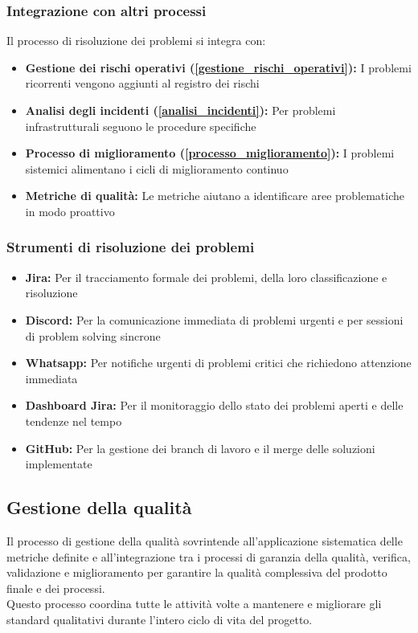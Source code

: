 \documentclass[a4paper,12pt]{article}
\begin{document}
\subsubsection{Integrazione con altri processi}\label{integrazione_risoluzione_problemi}
Il processo di risoluzione dei problemi si integra con:
\begin{itemize}
    \item \textbf{Gestione dei rischi operativi (\ref{gestione_rischi_operativi}):} I problemi ricorrenti vengono aggiunti al registro dei rischi
    \item \textbf{Analisi degli incidenti (\ref{analisi_incidenti}):} Per problemi infrastrutturali seguono le procedure specifiche
    \item \textbf{Processo di miglioramento (\ref{processo_miglioramento}):} I problemi sistemici alimentano i cicli di miglioramento continuo
    \item \textbf{Metriche di qualità:} Le metriche aiutano a identificare aree problematiche in modo proattivo
\end{itemize}

\subsubsection{Strumenti di risoluzione dei problemi}\label{strumenti_risoluzione_problemi}
\begin{itemize}
    \item \textbf{Jira:} Per il tracciamento formale dei problemi, della loro classificazione e risoluzione
    \item \textbf{Discord:} Per la comunicazione immediata di problemi urgenti e per sessioni di problem solving sincrone
    \item \textbf{Whatsapp:} Per notifiche urgenti di problemi critici che richiedono attenzione immediata
    \item \textbf{Dashboard Jira:} Per il monitoraggio dello stato dei problemi aperti e delle tendenze nel tempo
    \item \textbf{GitHub:} Per la gestione dei branch di lavoro e il merge delle soluzioni implementate
\end{itemize}

\subsection{Gestione della qualità}\label{gestione_qualita}
Il processo di gestione della qualità sovrintende all'applicazione sistematica delle metriche definite e all'integrazione tra i processi di
garanzia della qualità, verifica, validazione e miglioramento per garantire la qualità complessiva del prodotto finale e dei processi. 
\\Questo processo coordina tutte le attività volte a mantenere e migliorare gli standard qualitativi durante l'intero ciclo di vita del progetto.
\end{document}
